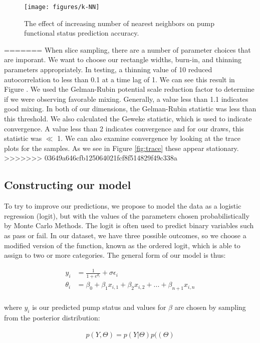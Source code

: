 \documentclass{article} %
\begin{document}
\begin{figure}
  \centering
    \texttt{[image: figures/k-NN]}
    \label{fig:kNN}
  \caption{The effect of increasing number of nearest neighbors on pump functional status prediction accuracy.}
\end{figure}
=======
When slice sampling, there are a number of parameter choices that are imporant. We want to choose our rectangle widths, burn-in, and thinning parameters appropriately. In testing, a thinning value of 10 reduced autocorrelation to less than 0.1 at a time lag of 1. We can see this result in Figure . We used the Gelman-Rubin potential scale reduction factor\cite{Gelman-Rubin} to determine if we were observing favorable mixing. Generally, a value less than 1.1 indicates good mixing. In both of our dimensions, the Gelman-Rubin statistic was less than this threshold. We also calculated the Geweke statistic, which is used to indicate convergence. A value less than 2 indicates convergence and for our draws, this statistic was $\ll$ 1. We can also examine convergence by looking at the trace plots for the samples. As we see in Figure \ref{fig:trace} these appear stationary.
>>>>>>> 03649a646cfb125064021fcf8f514829f49c338a

\subsection{Constructing our model}
To try to improve our predictions, we propose to model the data as a logistic regression (logit), but with the values of the parameters chosen probabilistically by Monte Carlo Methods.  The logit is often used to predict binary variables such as pass or fail. In our dataset, we have three possible outcomes, so we choose a modified version of the function, known as the ordered logit, which is able to assign to two or more categories. The general form of our model is thus:

\begin{align*}
y_i &= \frac{1}{1 + e^{\theta_i}} + \sigma \epsilon_i \\
\theta_i &= \beta_0 + \beta_1x_{i,1} + \beta_2x_{i,2} +  ... + \beta_{n+1}x_{i,n}\\
\end{align*}

where $y_i$ is our predicted pump status and values for $\beta$ are chosen by sampling from the posterior distribution:

\begin{align*}
p(Y, \Theta) = p(Y|\Theta)p((\Theta)
\end{align*}
\end{document}
